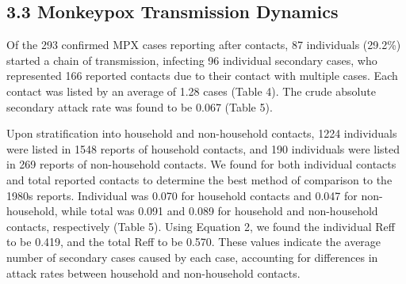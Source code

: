 \subsection{3.3	Monkeypox Transmission Dynamics}

Of the 293 confirmed MPX cases reporting after contacts, 87 individuals (29.2\%) started a chain of transmission, infecting 96 individual secondary cases, who represented 166 reported contacts due to their contact with multiple cases. Each contact was listed by an average of 1.28 cases (Table 4). The crude absolute secondary attack rate was found to be 0.067 (Table 5).  

Upon stratification into household and non-household contacts, 1224 individuals were listed in 1548 reports of household contacts, and 190 individuals were listed in 269 reports of non-household contacts. We found   for both individual contacts and total reported contacts to determine the best method of comparison to the 1980s reports. Individual   was 0.070 for household contacts and 0.047 for non-household, while total  was 0.091 and 0.089 for household and non-household contacts, respectively (Table 5). Using Equation 2, we found the individual Reff to be 0.419, and the total Reff to be 0.570. These values indicate the average number of secondary cases caused by each case, accounting for differences in attack rates between household and non-household contacts. 